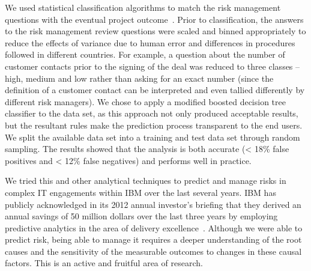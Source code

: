  We used statistical classification algorithms to match the risk management questions with the eventual project outcome~\cite{risk28}. Prior to classification, the answers to the risk management review questions were scaled and binned appropriately to reduce the effects of variance due to human error and differences in procedures followed in different countries. For example, a question about the number of customer contacts prior to the signing of the deal was reduced to three classes -- high, medium and low rather than asking for an exact number (since the definition of a customer contact can be interpreted and even tallied differently by different risk managers). We chose to apply a modified boosted decision tree classifier to the data set, as this approach not only produced acceptable results, but the resultant rules make the prediction process transparent to the end users. We split the available data set into a training and test data set through random sampling. The results showed that the analysis is both accurate (< 18\% false positives and < 12\% false negatives) and performs well in practice.

 We tried this and other analytical techniques to predict and manage risks in complex IT engagements within IBM over the last several years. IBM has publicly acknowledged in its 2012 annual investor's briefing that they derived an annual savings of 50 million dollars over the last three years by employing predictive analytics in the area of delivery excellence~\cite{ibm-investors-briefing}. Although we were able to predict risk, being able to manage it requires a deeper understanding of the root causes and the sensitivity of the measurable outcomes to changes in these causal factors. This is an active and fruitful area of research.

\label{sec:risk}
